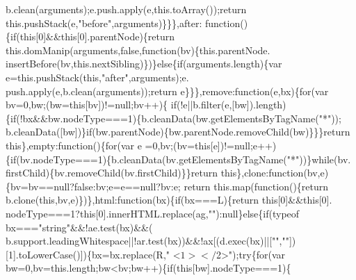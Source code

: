 \begin{DoxyCode}
{      b.clean(arguments);e.push.apply(e,this.toArray());\textcolor{keywordflow}{return} this.pushStack(e,\textcolor{stringliteral}{"before"},arguments)\}\}\},after:\textcolor{keyword}{
      function}()\{\textcolor{keywordflow}{if}(\textcolor{keyword}{this}[0]&&\textcolor{keyword}{this}[0].parentNode)\{\textcolor{keywordflow}{return} this.domManip(arguments,\textcolor{keyword}{false},\textcolor{keyword}{function}(bv)\{this.parentNode.
      insertBefore(bv,this.nextSibling)\})\}\textcolor{keywordflow}{else}\{\textcolor{keywordflow}{if}(arguments.length)\{var e=this.pushStack(\textcolor{keyword}{this},\textcolor{stringliteral}{"after"},arguments);e.
      push.apply(e,b.clean(arguments));\textcolor{keywordflow}{return} e\}\}\},\textcolor{keyword}{remove}:\textcolor{keyword}{function}(e,bx)\{\textcolor{keywordflow}{for}(var bv=0,bw;(bw=\textcolor{keyword}{this}[bv])!=null;bv++)\{\textcolor{keywordflow}{
      if}(!e||b.filter(e,[bw]).length)\{\textcolor{keywordflow}{if}(!bx&&bw.nodeType===1)\{b.cleanData(bw.getElementsByTagName(\textcolor{stringliteral}{"*"}));
      b.cleanData([bw])\}\textcolor{keywordflow}{if}(bw.parentNode)\{bw.parentNode.removeChild(bw)\}\}\}\textcolor{keywordflow}{return} \textcolor{keyword}{this}\},empty:\textcolor{keyword}{function}()\{\textcolor{keywordflow}{for}(var e
      =0,bv;(bv=\textcolor{keyword}{this}[e])!=null;e++)\{\textcolor{keywordflow}{if}(bv.nodeType===1)\{b.cleanData(bv.getElementsByTagName(\textcolor{stringliteral}{"*"}))\}\textcolor{keywordflow}{while}(bv.
      firstChild)\{bv.removeChild(bv.firstChild)\}\}\textcolor{keywordflow}{return} \textcolor{keyword}{this}\},clone:\textcolor{keyword}{function}(bv,e)\{bv=bv==null?\textcolor{keyword}{false}:bv;e=e==null?bv:e;\textcolor{keywordflow}{
      return} this.map(\textcolor{keyword}{function}()\{\textcolor{keywordflow}{return} b.clone(\textcolor{keyword}{this},bv,e)\})\},html:\textcolor{keyword}{function}(bx)\{\textcolor{keywordflow}{if}(bx===L)\{\textcolor{keywordflow}{return} \textcolor{keyword}{this}[0]&&\textcolor{keyword}{this}[0].
      nodeType===1?\textcolor{keyword}{this}[0].innerHTML.replace(ag,\textcolor{stringliteral}{""}):null\}\textcolor{keywordflow}{else}\{\textcolor{keywordflow}{if}(typeof bx===\textcolor{stringliteral}{"string"}&&!ae.test(bx)&&(
      b.support.leadingWhitespace||!ar.test(bx))&&!ax[(d.exec(bx)||[\textcolor{stringliteral}{""},\textcolor{stringliteral}{""}])[1].toLowerCase()])\{bx=bx.replace(R,\textcolor{stringliteral}{"
      <$1></$2>"});\textcolor{keywordflow}{try}\{\textcolor{keywordflow}{for}(var bw=0,bv=this.length;bw<bv;bw++)\{\textcolor{keywordflow}{if}(\textcolor{keyword}{this}[bw].nodeType===1)\{
}
\end{DoxyCode}
